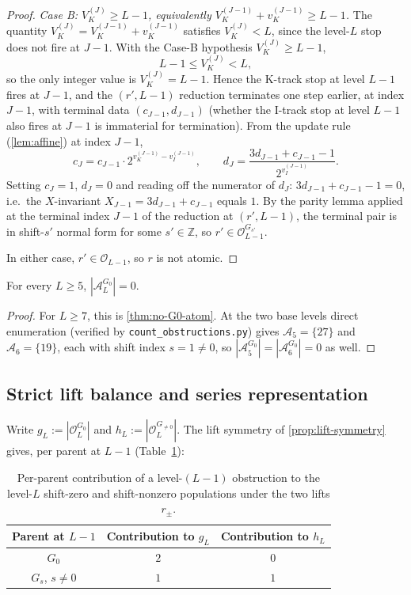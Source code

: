 \documentclass[11pt,reqno]{amsart}
\newcommand{\Z}{\mathbb{Z}}
\newcommand{\Obs}{\mathcal{O}}
\newcommand{\Atom}{\mathcal{A}}
\newcommand{\Vk}{V_{K}}
\newcommand{\vk}{v_{K}}
\newcommand{\vi}{v_{I}}
\begin{document}
\begin{proof}
\emph{Case B: $\Vk^{(J)} \ge L - 1$, equivalently
$\Vk^{(J-1)} + \vk^{(J-1)} \ge L - 1$.} The quantity
$\Vk^{(J)} = \Vk^{(J-1)} + \vk^{(J-1)}$ satisfies $\Vk^{(J)} < L$, since
the level-$L$ stop does not fire at $J - 1$. With the Case-B hypothesis
$\Vk^{(J)} \ge L - 1$,
\[
L - 1 \le \Vk^{(J)} < L,
\]
so the only integer value is $\Vk^{(J)} = L - 1$. Hence the
K-track stop at level $L - 1$ fires at $J - 1$, and the $(r', L-1)$
reduction terminates one step earlier, at index $J - 1$, with terminal
data $(c_{J-1}, d_{J-1})$ (whether the I-track stop at level $L - 1$
also fires at $J - 1$ is immaterial for termination). From the update
rule (\cref{lem:affine}) at index $J - 1$,
\[
c_J = c_{J-1} \cdot 2^{\vk^{(J-1)} - \vi^{(J-1)}}, \qquad d_J = \frac{3 d_{J-1} + c_{J-1} - 1}{2^{\vi^{(J-1)}}}.
\]
Setting $c_J = 1$, $d_J = 0$ and reading off the numerator of $d_J$:
$3 d_{J-1} + c_{J-1} - 1 = 0$, i.e.\ the $X$-invariant
$X_{J-1} = 3 d_{J-1} + c_{J-1}$ equals $1$. By the parity lemma
applied at the terminal index $J - 1$ of the reduction at $(r', L-1)$,
the terminal pair is in shift-$s'$ normal form for some $s' \in \Z$, so
$r' \in \Obs_{L-1}^{G_{s'}}$.

In either case, $r' \in \Obs_{L-1}$, so $r$ is not atomic. \qedhere
\end{proof}

\begin{corollary}\label{cor:no-G0-atom-all}
For every $L \ge 5$, $|\Atom_L^{G_0}| = 0$.
\end{corollary}

\begin{proof}
For $L \ge 7$, this is \cref{thm:no-G0-atom}. At the two base
levels direct enumeration (verified by \texttt{count\_obstructions.py})
gives $\Atom_5 = \{27\}$ and $\Atom_6 = \{19\}$, each with shift index
$s = 1 \ne 0$, so $|\Atom_5^{G_0}| = |\Atom_6^{G_0}| = 0$ as well.
\qedhere
\end{proof}

\subsection{Strict lift balance and series representation}

Write $g_L := |\Obs_L^{G_0}|$ and $h_L := |\Obs_L^{G_{\ne 0}}|$. The lift
symmetry of \cref{prop:lift-symmetry} gives, per parent at
$L - 1$ (Table~\ref{tab:lift-balance}):

\begin{table}[ht]
\centering
\begin{tabular}{c|cc}
\toprule
Parent at $L-1$ & Contribution to $g_L$ & Contribution to $h_L$ \\
\midrule
$G_0$ & $2$ & $0$ \\
$G_s$, $s \ne 0$ & $1$ & $1$ \\
\bottomrule
\end{tabular}
\caption{Per-parent contribution of a level-$(L-1)$ obstruction to the level-$L$ shift-zero and shift-nonzero populations under the two lifts $r_\pm$.}
\label{tab:lift-balance}
\end{table}
\end{document}

